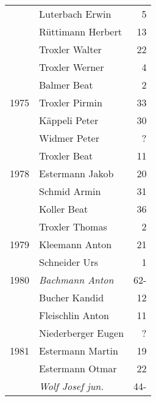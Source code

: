 {\begin{longtable}{ l l r }
                      & Luterbach Erwin                           & 5           \\
                      & Rüttimann Herbert                         & 13          \\
                      & Troxler Walter                            & 22          \\
                      & Troxler Werner                            & 4           \\
                      & Balmer Beat                               & 2           \\
        1975          & Troxler Pirmin                            & 33          \\
                      & Käppeli Peter                             & 30          \\
                      & Widmer Peter                              & ?           \\
                      & Troxler Beat                              & 11          \\
        1978          & Estermann Jakob                           & 20          \\
                      & Schmid Armin                              & 31          \\
                      & Koller Beat                               & 36          \\
                      & Troxler Thomas                            & 2           \\
        1979          & Kleemann Anton                            & 21          \\
                      & Schneider Urs                             & 1           \\
        1980          & \emph{Bachmann Anton}                     & 62-         \\
                      & Bucher Kandid                             & 12          \\
                      & Fleischlin Anton                          & 11          \\
                      & Niederberger Eugen                        & ?           \\
        1981          & Estermann Martin                          & 19          \\
                      & Estermann Otmar                           & 22          \\
                      & \emph{Wolf Josef jun.}                    & 44-         \\

\end{longtable}}
